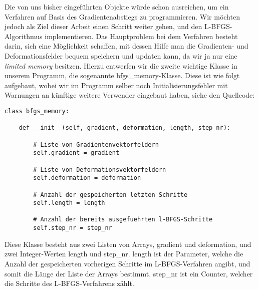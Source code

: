 Die von uns bisher eingeführten Objekte würde schon ausreichen, um ein Verfahren auf Basis des Gradientenabstiegs zu programmieren. Wir möchten jedoch als Ziel dieser Arbeit einen Schritt weiter gehen, und den L-BFGS-Algorithmus implementieren. Das Hauptproblem bei dem Verfahren besteht darin, sich eine Möglichkeit schaffen, mit dessen Hilfe man die Gradienten- und Deformationsfelder bequem speichern und updaten kann, da wir ja nur eine \textit{limited memory} besitzen. Hierzu entwerfen wir die zweite wichtige Klasse in unserem Programm, die sogenannte \textsf{bfgs\_memory}-Klasse. Diese ist wie folgt aufgebaut, wobei wir im Programm selber noch Initialisierungsfehler mit Warnungen an künftige weitere Verwender eingebaut haben, siehe den Quellcode:

\begin{lstlisting}
class bfgs_memory:

    def __init__(self, gradient, deformation, length, step_nr):

        # Liste von Gradientenvektorfeldern
        self.gradient = gradient

        # Liste von Deformationsvektorfeldern
        self.deformation = deformation

        # Anzahl der gespeicherten letzten Schritte
        self.length = length

        # Anzahl der bereits ausgefuehrten l-BFGS-Schritte
        self.step_nr = step_nr
\end{lstlisting}

Diese Klasse besteht aus zwei Listen von Arrays, \textsf{gradient} und \textsf{deformation}, und zwei Integer-Werten \textsf{length} und \textsf{step\_nr}. 
\textsf{length} ist der Parameter, welche die Anzahl der gespeicherten vorherigen Schritte im L-BFGS-Verfahren angibt, und somit die Länge der Liste der Arrays bestimmt. \textsf{step\_nr} ist ein Counter, welcher die Schritte des L-BFGS-Verfahrens zählt. 

